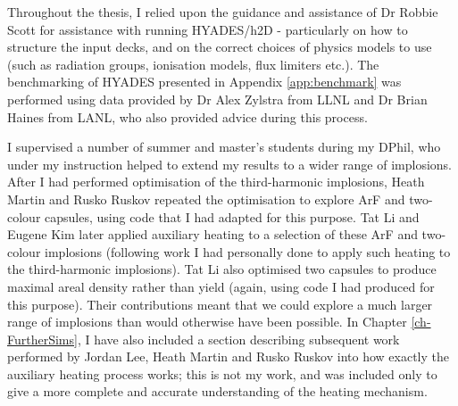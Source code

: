 Throughout the thesis, I relied upon the guidance and assistance of Dr Robbie Scott for assistance with running HYADES/h2D - particularly on how to structure the input decks, and on the correct choices of physics models to use (such as radiation groups, ionisation models, flux limiters etc.). The benchmarking of HYADES presented in Appendix \ref{app:benchmark} was performed using data  provided by Dr Alex Zylstra from LLNL and Dr Brian Haines from LANL, who also provided advice during this process.

I supervised a number of summer and master's students during my DPhil, who under my instruction helped to extend my results to a wider range of implosions. After I had performed optimisation of the third-harmonic implosions, Heath Martin and Rusko Ruskov repeated the optimisation to explore ArF and two-colour capsules, using code that I had adapted for this purpose. Tat Li and Eugene Kim later applied auxiliary heating to a selection of these ArF and two-colour implosions (following work I had personally done to apply such heating to the third-harmonic implosions). Tat Li also optimised two capsules to produce maximal areal density rather than yield (again, using code I had produced for this purpose). Their contributions meant that we could explore a much larger range of implosions than would otherwise have been possible. In Chapter \ref{ch-FurtherSims}, I have also included a section describing subsequent work performed by Jordan Lee, Heath Martin and Rusko Ruskov into how exactly the auxiliary heating process works; this is not my work, and was included only to give a more complete and accurate understanding of the heating mechanism.



